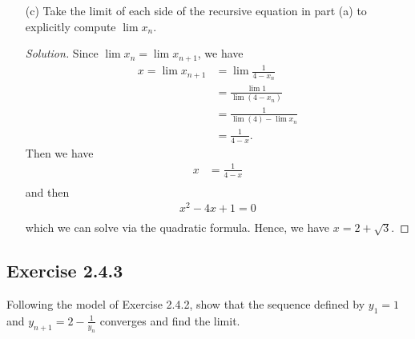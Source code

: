 \begin{enumerate}
        \begin{proof}[Solution]
            Since \( (x_n) \) is \textit{monotone} and \textit{bounded}, then \( (x_{n+1})\) is also \textit{monotone} and \textit{bounded}. By the Monotone Convergence Theorem, we have that \( (x_{n+1})\) is also convergent. Hence, \( \lim x_{n+1}\) also exists.    
        \end{proof}
    \item[(c)] Take the limit of each side of the recursive equation in part (a) to explicitly compute \( \lim x_n \). 
        \begin{proof}[Solution]
            Since \( \lim x_n = \lim x_{n+1}\), we have
            \begin{align*}
                x = \lim x_{n+1} &= \lim \frac{1}{4-x_n}  \\ 
                                 &= \frac{ \lim 1 }{ \lim (4 - x_n ) } \\ 
                                 &= \frac{1}{ \lim (4) - \lim x_n} \\
                                 &= \frac{1}{4 - x} \tag{ \( \lim x_n = x \)}.
            \end{align*}
            Then we have 
            \begin{align*}
                x &= \frac{1}{4-x} \\
            \end{align*}
            and then 
            \begin{align*}
                x^2 - 4x + 1 = 0 \\ 
            \end{align*}
            which we can solve via the quadratic formula. Hence, we have \( x = 2 + \sqrt{3}\). 
        \end{proof}

\end{enumerate}

\subsection{Exercise 2.4.3}
Following the model of Exercise 2.4.2, show that the sequence defined by \( y_1 = 1 \) and \( y_{n+1} = 2 - \frac{1}{y_n}\) converges and find the limit.

